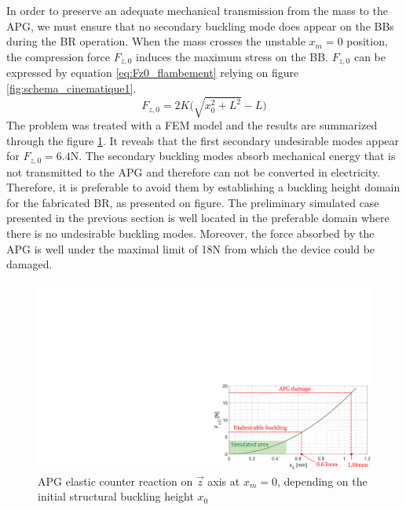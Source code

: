 \documentclass[3p,twocolumn,preprint]{elsarticle}
\begin{document}
In order to preserve an adequate mechanical transmission from the mass to the APG, we must ensure that no secondary buckling mode does appear on the BBs during the BR operation. When the mass crosses the unstable \mbox{$x_m=0$} position, the compression force $F_{z,0}$ induces the maximum stress on the BB. $F_{z,0}$ can be expressed by equation \ref{eq:Fz0_flambement} relying on figure \ref{fig:schema_cinematique1}.
\begin{equation}
	F_{z,0} = 2K \biggl( \sqrt{x_0^2+L^2}-L \biggr)
	\label{eq:Fz0_flambement}
\end{equation}
The problem was treated with a FEM model and the results are summarized through the figure \ref{fig:buckling_limit}. It reveals that the first secondary undesirable modes appear for $F_{z,0}=6.4$N. The secondary buckling modes absorb mechanical energy that is not transmitted to the APG and therefore can not be converted in electricity. Therefore, it is preferable to avoid them by establishing a buckling height domain for the fabricated BR, as presented on figure. The preliminary simulated case presented in the previous section is well located in the preferable domain where there is no undesirable buckling modes. Moreover, the force absorbed by the APG is well under the maximal limit of 18N from which the device could be damaged.
\begin{figure}[!htbp]
	\centering
	\captionsetup{justification=centering}
	\includegraphics[trim={17.9cm 0cm 0cm 10cm},clip,width=0.9\linewidth]{figures/buckling_limit.pdf}
	\caption{APG elastic counter reaction on $\vec{z}$ axis at $x_m=0$, depending on the initial structural buckling height $x_0$}
	\label{fig:buckling_limit}
\end{figure}

\end{document}

